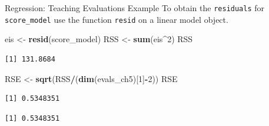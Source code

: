 \documentclass[
  ignorenonframetext,
]{beamer}
\newenvironment{Shaded}{\begin{snugshade}}{\end{snugshade}}
\newcommand{\CommentTok}[1]{\textcolor[rgb]{0.56,0.35,0.01}{\textit{#1}}}
\newcommand{\DecValTok}[1]{\textcolor[rgb]{0.00,0.00,0.81}{#1}}
\newcommand{\FunctionTok}[1]{\textcolor[rgb]{0.13,0.29,0.53}{\textbf{#1}}}
\newcommand{\NormalTok}[1]{#1}
\newcommand{\OtherTok}[1]{\textcolor[rgb]{0.56,0.35,0.01}{#1}}
\newcommand{\SpecialCharTok}[1]{\textcolor[rgb]{0.81,0.36,0.00}{\textbf{#1}}}
\begin{document}
\begin{frame}[fragile]{Regression: Teaching Evaluations Example}
\protect{}\label{regression-teaching-evaluations-example-9}
To obtain the \texttt{residuals} for \texttt{score\_model} use the
function \texttt{resid} on a linear model object.

\normalsize

\begin{Shaded}
\begin{Highlighting}[]
\NormalTok{eis }\OtherTok{\textless{}{-}} \FunctionTok{resid}\NormalTok{(score\_model)}
\NormalTok{RSS }\OtherTok{\textless{}{-}} \FunctionTok{sum}\NormalTok{(eis}\SpecialCharTok{\^{}}\DecValTok{2}\NormalTok{)}
\NormalTok{RSS}
\end{Highlighting}
\end{Shaded}

\begin{verbatim}
[1] 131.8684
\end{verbatim}

\begin{Shaded}
\begin{Highlighting}[]
\NormalTok{RSE }\OtherTok{\textless{}{-}} \FunctionTok{sqrt}\NormalTok{(RSS}\SpecialCharTok{/}\NormalTok{(}\FunctionTok{dim}\NormalTok{(evals\_ch5)[}\DecValTok{1}\NormalTok{]}\SpecialCharTok{{-}}\DecValTok{2}\NormalTok{))}
\NormalTok{RSE}
\end{Highlighting}
\end{Shaded}

\begin{verbatim}
[1] 0.5348351
\end{verbatim}

\begin{Shaded}
\end{Shaded}

\begin{verbatim}
[1] 0.5348351
\end{verbatim}

\normalsize
\end{frame}
\end{document}
